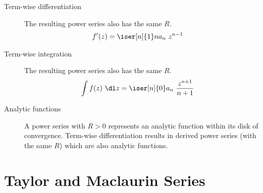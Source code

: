 \begin{description}
    \item[Term-wise differentiation] The resulting power series also has the same $ R $.
        \begin{align}
            f'(z) & = \iser[n]{1} na_n\ z^{n-1}
        \end{align}

    \item[Term-wise integration] The resulting power series also has the same $ R $.
        \begin{align}
            \int f(z)\ \dl z & = \iser[n]{0} a_n\ \frac{z^{n+1}}{n+1}
        \end{align}

    \item[Analytic functions] A power series with $ R > 0 $ represents an analytic
        function within its disk of convergence. Term-wise differentiation results in
        derived power series (with the same $ R $) which are also analytic functions.
\end{description}

\section{Taylor and Maclaurin Series}

